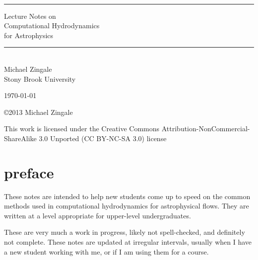 \documentclass[11pt]{book}
\newcommand{\HRule}{\rule{\linewidth}{0.125mm}}
\renewcommand{\chaptermark}[1]{%
 \markboth{\chaptername
\ \thechapter.\ #1}{}}
\begin{document}
\frontmatter

\begin{titlepage}

\ \\[2.5in]
\begin{center}
\HRule
{\Huge \textsf{{
Lecture Notes on \\
Computational Hydrodynamics\\ 
for Astrophysics}}
}
\HRule
\\[2em]

{\Large \sf Michael Zingale} \\ {\sf Stony Brook University}
\end{center}

\vfill

\begin{flushright}
\today
\end{flushright}

\end{titlepage}

\null \vfill 

\noindent \copyright 2013 Michael Zingale 

\noindent This work is licensed under the Creative Commons
Attribution-NonCommercial-ShareAlike 3.0 Unported (CC BY-NC-SA 3.0)
license



\setcounter{tocdepth}{2}
\tableofcontents

\clearpage

\listoffigures
{}

\clearpage

\listofexercise

\clearpage

\chapter*{preface}
\chaptermark{preface}


These notes are intended to help new students come up to speed on the
common methods used in computational hydrodynamics for astrophysical
flows.  They are written at a level appropriate for upper-level
undergraduates.

These are very much a work in progress, likely not spell-checked, and 
definitely not complete.  These notes are updated at irregular
intervals, usually when I have a new student working with me, or if
I am using them for a course.
\end{document}
